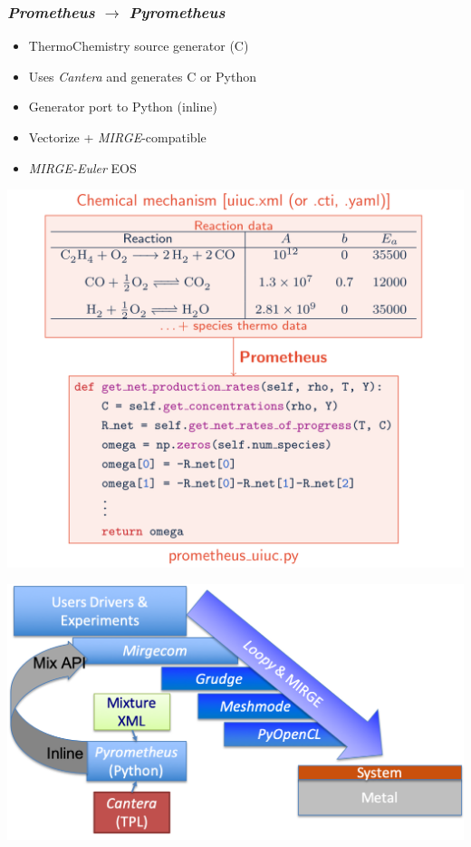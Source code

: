 \begin{frame}\frametitle{\textit{Prometheus} $\rightarrow$ \textit{Pyrometheus}}
  \begin{multicols}{2}
      \begin{itemize}
      \item ThermoChemistry source generator (C\plusplus{})
      \item Uses \textit{Cantera} and generates C\plusplus{} or Python
      \end{itemize}
      \columnbreak
      \begin{itemize}
      \item Generator port to Python (inline)
      \item Vectorize + \textit{MIRGE}-compatible
      \item \textit{MIRGE-Euler} EOS
      \end{itemize}
  \end{multicols}
  \begin{multicols}{2}
    \includegraphics[width=.5\textwidth]{figures/mtc/Prometheus2.png}\\
    \begin{center}
    \end{center}
      \columnbreak
      \vspace{10pt}
    \includegraphics[width=.5\textwidth]{figures/mtc/PyrometheusIntegration.png}    
  \end{multicols}
\end{frame}

